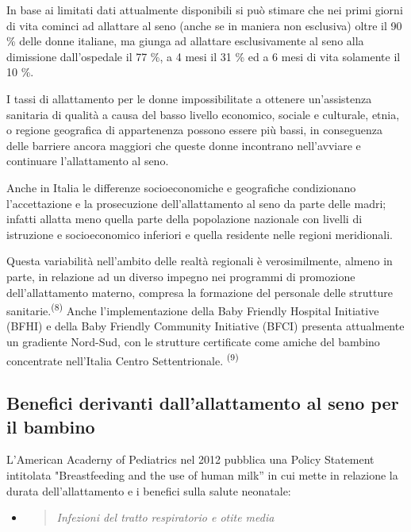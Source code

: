\documentclass[]{article}
\begin{document}
In base ai limitati dati attualmente disponibili si può stimare che nei
primi giorni di vita cominci ad allattare al seno (anche se in maniera
non esclusiva) oltre il 90 \% delle donne italiane, ma giunga ad
allattare esclusivamente al seno alla dimissione dall'ospedale il 77 \%,
a 4 mesi il 31 \% ed a 6 mesi di vita solamente il 10 \%.

I tassi di allattamento per le donne impossibilitate a ottenere
un'assistenza sanitaria di qualità a causa del basso livello economico,
sociale e culturale, etnia, o regione geografica di appartenenza possono
essere più bassi, in conseguenza delle barriere ancora maggiori che
queste donne incontrano nell'avviare e continuare l'allattamento al
seno.

Anche in Italia le differenze socioeconomiche e geografiche condizionano
l'accettazione e la prosecuzione dell'allattamento al seno da parte
delle madri; infatti allatta meno quella parte della popolazione
nazionale con livelli di istruzione e socioeconomico inferiori e quella
residente nelle regioni meridionali.

Questa variabilità nell'ambito delle realtà regionali è verosimilmente,
almeno in parte, in relazione ad un diverso impegno nei programmi di
promozione dell'allattamento materno, compresa la formazione del
personale delle strutture sanitarie.\textsuperscript{(8)} Anche
l'implementazione della Baby Friendly Hospital Initiative (BFHI) e della
Baby Friendly Community Initiative (BFCI) presenta attualmente un
gradiente Nord-Sud, con le strutture certificate come amiche del bambino
concentrate nell'Italia Centro Settentrionale. \textsuperscript{(9) }

\hypertarget{benefici-derivanti-dallallattamento-al-seno-per-il-bambino}{%
\subsection{Benefici derivanti dall'allattamento al seno per il
bambino}\label{benefici-derivanti-dallallattamento-al-seno-per-il-bambino}}

L'American Acaderny of Pediatrics nel 2012 pubblica una Policy Statement
intitolata "Breastfeeding and the use of human milk'' in cui mette in
relazione la durata dell'allattamento e i benefici sulla salute
neonatale:

\begin{itemize}
\item
  \begin{quote}
  \emph{Infezioni del tratto respiratorio e otite media}
  \end{quote}
\end{itemize}
\end{document}
